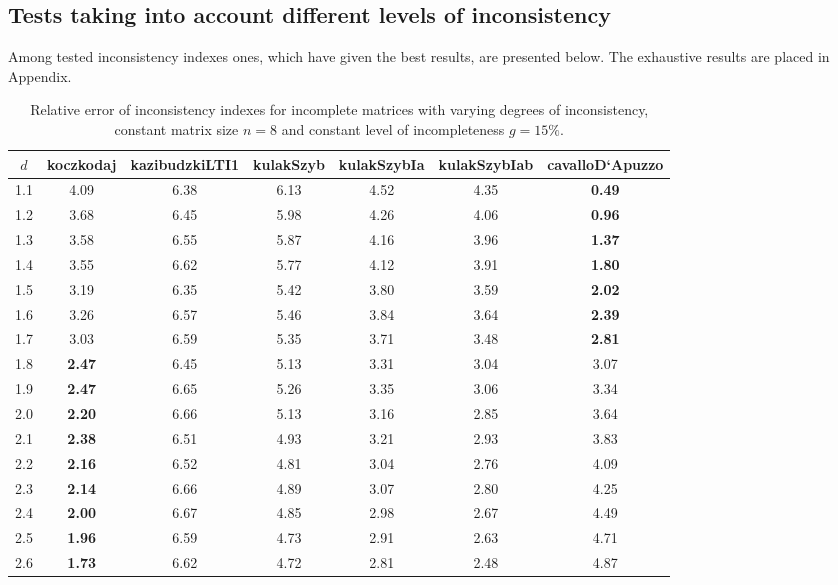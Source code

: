 \subsection{Tests taking into account different levels of inconsistency}
Among tested inconsistency indexes ones, which have given the best results, are presented below. The exhaustive results are placed in Appendix.
\begin{table}[h]
\begin{center}
\caption{Relative error of inconsistency indexes for incomplete matrices with varying degrees of inconsistency, constant matrix size $n=8$ and constant level of incompleteness $g=15\%$.}
\label{tab:results1}
\begin{tabular}{|c||c|c|c|c|c|c|}
\hline $d$ & koczkodaj & kazibudzkiLTI1 & kulakSzyb & kulakSzybIa & kulakSzybIab & cavalloD`Apuzzo  \\ \hline \hline
1.1 & 4.09 & 6.38 & 6.13 & 4.52 & 4.35 & \textbf{0.49} \\ \hline
1.2 & 3.68 & 6.45 & 5.98 & 4.26 & 4.06 & \textbf{0.96} \\ \hline
1.3 & 3.58 & 6.55 & 5.87 & 4.16 & 3.96 & \textbf{1.37} \\ \hline
1.4 & 3.55 & 6.62 & 5.77 & 4.12 & 3.91 & \textbf{1.80} \\ \hline
1.5 & 3.19 & 6.35 & 5.42 & 3.80 & 3.59 & \textbf{2.02} \\ \hline
1.6 & 3.26 & 6.57 & 5.46 & 3.84 & 3.64 & \textbf{2.39} \\ \hline
1.7 & 3.03 & 6.59 & 5.35 & 3.71 & 3.48 & \textbf{2.81} \\ \hline
1.8 & \textbf{2.47} & 6.45 & 5.13 & 3.31 & 3.04 & 3.07 \\ \hline
1.9 & \textbf{2.47} & 6.65 & 5.26 & 3.35 & 3.06 & 3.34 \\ \hline
2.0 & \textbf{2.20} & 6.66 & 5.13 & 3.16 & 2.85 & 3.64 \\ \hline
2.1 & \textbf{2.38} & 6.51 & 4.93 & 3.21 & 2.93 & 3.83 \\ \hline
2.2 & \textbf{2.16} & 6.52 & 4.81 & 3.04 & 2.76 & 4.09 \\ \hline
2.3 & \textbf{2.14} & 6.66 & 4.89 & 3.07 & 2.80 & 4.25 \\ \hline
2.4 & \textbf{2.00} & 6.67 & 4.85 & 2.98 & 2.67 & 4.49 \\ \hline
2.5 & \textbf{1.96} & 6.59 & 4.73 & 2.91 & 2.63 & 4.71 \\ \hline
2.6 & \textbf{1.73} & 6.62 & 4.72 & 2.81 & 2.48 & 4.87 \\ \hline

\end{tabular}
\end{center}
\end{table}
